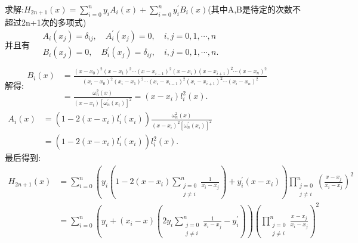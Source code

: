 \documentclass[12pt, a4paper, oneside]{ctexart}
\begin{document}
\begin{center}
    求解:$H_{2 n+1}(x)=\sum_{i=0}^n y_i A_i(x)+\sum_{i=0}^n y_i^{\prime} B_i(x)$(其中A,B是待定的次数不超过2n+1次的多项式)\\并且有
    $\begin{aligned} & A_i\left(x_j\right)=\delta_{i j}, \quad A_i^{\prime}\left(x_j\right)=0, 
    \quad i, j=0,1, \cdots, n \\ & B_i\left(x_j\right)=0, \quad B_i^{\prime}\left(x_j\right)=\delta_{i j}, \quad i, j=0,1, \cdots, n \text {. } \\ & \end{aligned}$\\
    解得:$\begin{aligned} B_i(x) & =\frac{\left(x-x_0\right)^2\left(x-x_1\right)^2 \cdots\left(x-x_{i-1}\right)^2\left(x-x_i\right)\left(x-x_{i+1}\right)^2 
        \cdots\left(x-x_n\right)^2}{\left(x_i-x_0\right)^2\left(x_i-x_1\right)^2 \cdots\left(x_i-x_{i-1}\right)^2\left(x_i-x_{i+1}\right)^2 \cdots\left(x_i-x_n\right)^2} \\
         & =\frac{\omega_n^2(x)}{\left(x-x_i\right)\left[\omega_n^{\prime}\left(x_i\right)\right]^2}=\left(x-x_i\right) l_i^2(x) .\end{aligned}$\\
         $\begin{aligned} A_i(x) & =\left(1-2\left(x-x_i\right) l_i^{\prime}\left(x_i\right)\right) \frac{\omega_n^2(x)}{\left(x-x_i\right)^2\left[\omega_n^{\prime}\left(x_i\right)\right]^2}
             \\ & =\left(1-2\left(x-x_i\right) l_i^{\prime}\left(x_i\right)\right) l_i^2(x) .\end{aligned}$\\
        最后得到:$\begin{aligned} H_{2 n+1}(x) & =\sum_{i=0}^n\left(y_i\left(1-2\left(x-x_i\right) \sum_{\substack{j=0 \\ j \neq i}}^n \frac{1}{x_i-x_j}\right)+y_i^{\prime}\left(x-x_i\right)\right) 
            \prod_{\substack{j=0 \\ j \neq i}}^n\left(\frac{x-x_j}{x_i-x_j}\right)^2 \\ & =\sum_{i=0}^n\left(y_i+\left(x_i-x\right)\left(2 y_i \sum_{\substack{j=0 \\ j \neq i}}^n \frac{1}{x_i-x_j}-y_i^{\prime}\right)\right)
            \left(\prod_{\substack{j=0 \\ j \neq i}}^n \frac{x-x_j}{x_i-x_j}\right)^2\end{aligned}$
\end{center}\vspace*{15pt}
\end{document}
